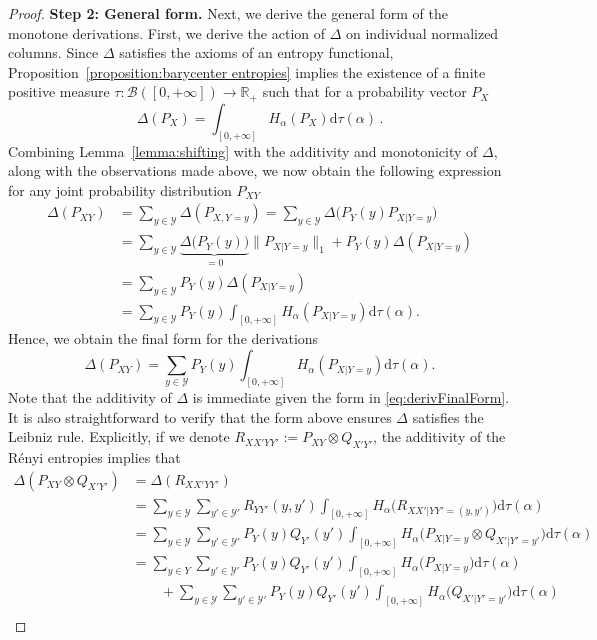 \documentclass[aps,pra,11pt,onecolumn,nofootinbib,tightenlines]{revtex4-2}
\theoremstyle{definition}
\def \d {\mathrm{d}}
\newcommand{\Y}{\mathcal{Y}}
\newcommand{\R}{\mathbb{R}}
\begin{document}
\begin{proof}
\medskip
\noindent \noindent\textbf{Step 2: General form.}
Next, we derive the general form of the monotone derivations. First, we derive the action of $\Delta$ on individual normalized columns. Since $\Delta$ satisfies the axioms of an entropy functional, Proposition~\ref{proposition:barycenter entropies} implies the existence of a finite positive measure $\tau \colon \mathcal{B}([0, +\infty]) \to\R_+$ such that for a probability vector $P_X$
\begin{equation}
\Delta(P_X)=\int_{[0,+\infty]}H_\alpha(P_X)\d\tau(\alpha)\,.
\end{equation}
Combining Lemma~\ref{lemma:shifting} with the additivity and monotonicity of $\Delta$, along with the observations made above, we now obtain the following expression for any joint probability distribution $P_{XY}$
\begin{align}
\Delta(P_{XY})&=\sum_{y\in \Y}\Delta(P_{X,Y=y})=\sum_{y\in \Y}\Delta\big(P_Y(y)P_{X|Y=y}\big)\\
&=\sum_{y\in \Y}\underbrace{\Delta\big(P_Y(y)\big)}_{=0}\|P_{X|Y=y}\|_1+P_Y(y)\Delta(P_{X|Y=y})\\
&=\sum_{y\in \Y}P_Y(y)\Delta(P_{X|Y=y})\\
&=\sum_{y\in \Y}P_Y(y)\int_{[0,+\infty]}H_\alpha(P_{X|Y=y})\d\tau(\alpha).
\end{align}
Hence, we obtain the final form for the derivations
\begin{equation}
\label{eq:derivFinalForm}
    \Delta(P_{XY}) = \sum_{y\in \Y}P_Y(y)\int_{[0,+\infty]}H_\alpha(P_{X|Y=y})\d\tau(\alpha).
\end{equation}
Note that the additivity of $\Delta$ is immediate given the form in \eqref{eq:derivFinalForm}. It is also straightforward to verify that the form above ensures $\Delta$ satisfies the Leibniz rule. Explicitly, if we denote $R_{XX'YY'}:=P_{XY}\otimes Q_{X'Y'}$, the additivity
of the R\'{e}nyi entropies implies that
\begin{align}
\Delta(P_{XY}\otimes Q_{X'Y'})&=\Delta(R_{XX'YY'})\\
&=\sum_{y\in \Y}\sum_{y'\in \Y'}R_{YY'}(y,y')\int_{[0,+\infty]}H_\alpha\big(R_{XX'|YY'=(y,y')}\big)\d\tau(\alpha)\\
&=\sum_{y\in \Y}\sum_{y'\in \Y'}P_Y(y)Q_{Y'}(y')\int_{[0,+\infty]}H_\alpha\big(P_{X|Y=y}\otimes Q_{X'|Y'=y'}\big)\d\tau(\alpha)\\
&=\sum_{y\in Y}\sum_{y'\in \Y'}P_Y(y)Q_{Y'}(y')\int_{[0,+\infty]}H_\alpha\big(P_{X|Y=y}\big)\d\tau(\alpha)\\
&\qquad +\sum_{y\in \Y}\sum_{y'\in \Y'}P_Y(y)Q_{Y'}(y')\int_{[0,+\infty]}H_\alpha\big(Q_{X'|Y'=y'}\big)\d\tau(\alpha)\\

\end{align}
\end{proof}
\end{document}
